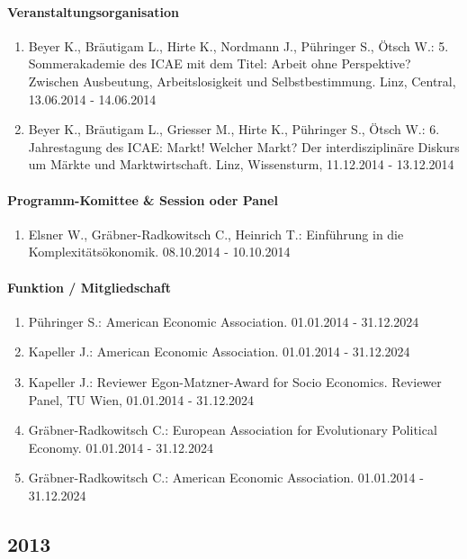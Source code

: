 \paragraph{Veranstaltungsorganisation}
\begin{enumerate}[leftmargin=*, labelsep=0.5cm]
\item Beyer K., Bräutigam L., Hirte K., Nordmann J., Pühringer S., Ötsch W.: 5. Sommerakademie des ICAE mit dem Titel: Arbeit ohne Perspektive? Zwischen Ausbeutung, Arbeitslosigkeit und Selbstbestimmung. Linz, Central, 13.06.2014 - 14.06.2014
\item Beyer K., Bräutigam L., Griesser M., Hirte K., Pühringer S., Ötsch W.: 6. Jahrestagung des ICAE: Markt! Welcher Markt? Der interdisziplinäre Diskurs um Märkte und Marktwirtschaft. Linz, Wissensturm, 11.12.2014 - 13.12.2014
\end{enumerate}

\paragraph{Programm-Komittee \& Session oder Panel}
\begin{enumerate}[leftmargin=*, labelsep=0.5cm]
\item Elsner W., Gräbner-Radkowitsch C., Heinrich T.: Einführung in die Komplexitätsökonomik. 08.10.2014 - 10.10.2014
\end{enumerate}

\paragraph{Funktion / Mitgliedschaft}
\begin{enumerate}[leftmargin=*, labelsep=0.5cm]
\item Pühringer S.: American Economic Association. 01.01.2014 - 31.12.2024
\item Kapeller J.: American Economic Association. 01.01.2014 - 31.12.2024
\item Kapeller J.: Reviewer Egon-Matzner-Award for Socio Economics. Reviewer Panel, TU Wien, 01.01.2014 - 31.12.2024
\item Gräbner-Radkowitsch C.: European Association for Evolutionary Political Economy. 01.01.2014 - 31.12.2024
\item Gräbner-Radkowitsch C.: American Economic Association. 01.01.2014 - 31.12.2024
\end{enumerate}
\subsection*{2013}
